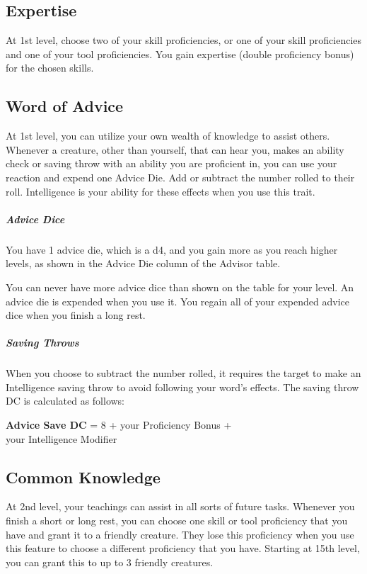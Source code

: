 \documentclass[letterpaper,openany,twoside,twocolumn]{book}
\begin{document}
	\subsection*{Expertise}
	At 1st level, choose two of your skill proficiencies, or one of your skill proficiencies and one of your tool proficiencies. You gain expertise (double proficiency bonus) for the chosen skills.
	
	\subsection*{Word of Advice}
	At 1st level, you can utilize your own wealth of knowledge to assist others. Whenever a creature, other than yourself, that can hear you, makes an ability check or saving throw with an ability you are proficient in, you can use your reaction and expend one Advice Die. Add or subtract the number rolled to their roll. Intelligence is your ability for these effects when you use this trait.
	
	\subparagraph*{Advice Dice} You have 1 advice die, which is a d4, and you gain more as you reach higher levels, as shown in the Advice Die column of the Advisor table.
	
	You can never have more advice dice than shown on the table for your level. An advice die is expended when you use it. You regain all of your expended advice dice when you finish a long rest.
	
	\subparagraph*{Saving Throws} When you choose to subtract the number rolled, it requires the target to make an Intelligence saving throw to avoid following your word’s effects. The saving throw DC is calculated as follows:
	\begin{center}
		\textbf{Advice Save DC} = 8 + your Proficiency Bonus + \\your Intelligence Modifier
	\end{center}
	
	\subsection*{Common Knowledge}
	At 2nd level, your teachings can assist in all sorts of future tasks. Whenever you finish a short or long rest, you can choose one skill or tool proficiency that you have and grant it to a friendly creature. They lose this proficiency when you use this feature to choose a different proficiency that you have. Starting at 15th level, you can grant this to up to 3 friendly creatures.
	
\end{document}
